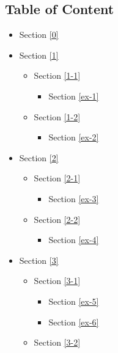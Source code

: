 \documentclass[11pt]{article}
\providecommand{\tightlist}{%
      \setlength{\itemsep}{0pt}\setlength{\parskip}{0pt}}
\begin{document}
    \hypertarget{table-of-content}{%
\subsection{Table of Content}\label{table-of-content}}

\begin{itemize}
\tightlist
\item
  Section \ref{0}
\item
  Section \ref{1}

  \begin{itemize}
  \tightlist
  \item
    Section \ref{1-1}

    \begin{itemize}
    \tightlist
    \item
      Section \ref{ex-1}
    \end{itemize}
  \item
    Section \ref{1-2}

    \begin{itemize}
    \tightlist
    \item
      Section \ref{ex-2}
    \end{itemize}
  \end{itemize}
\item
  Section \ref{2}

  \begin{itemize}
  \tightlist
  \item
    Section \ref{2-1}

    \begin{itemize}
    \tightlist
    \item
      Section \ref{ex-3}
    \end{itemize}
  \item
    Section \ref{2-2}

    \begin{itemize}
    \tightlist
    \item
      Section \ref{ex-4}
    \end{itemize}
  \end{itemize}
\item
  Section \ref{3}

  \begin{itemize}
  \tightlist
  \item
    Section \ref{3-1}

    \begin{itemize}
    \tightlist
    \item
      Section \ref{ex-5}
    \item
      Section \ref{ex-6}
    \end{itemize}
  \item
    Section \ref{3-2}


\end{itemize}
\end{itemize}
\end{document}
